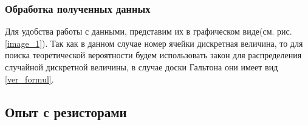 \subsubsection{Обработка полученных данных}

Для удобства работы с данными, представим их в графическом виде(см. рис. \ref{image_1}). Так как в данном случае номер ячейки дискретная величина, то для поиска теоретической вероятности будем использовать закон для распределения случайной дискретной величины, в случае доски Гальтона они имеет вид \eqref{ver_formul}.
\subsection{Опыт с резисторами}

